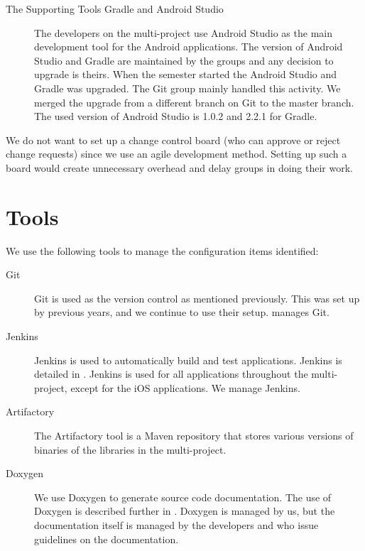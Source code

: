 \begin{description}
  \item[The Supporting Tools Gradle and Android Studio] The developers on the multi-project use Android Studio as the main development tool for the Android applications. The version of Android Studio and Gradle are maintained by the \bd groups and any decision to upgrade is theirs. When the semester started the Android Studio and Gradle was upgraded. The Git group mainly handled this activity. We merged the upgrade from a different branch on Git to the master branch. The used version of Android Studio is 1.0.2 and 2.2.1 for Gradle.
\end{description}

We do not want to set up a change control board (who can approve or reject change requests) since we use an agile development method. Setting up such a board would create unnecessary overhead and delay groups in doing their work.

\section{Tools}\label{sec:SCM_tools}
We use the following tools to manage the configuration items identified:

\begin{description}
  \item[Git] Git is used as the version control as mentioned previously. This was set up by previous years, and we continue to use their setup.  manages Git.
  \item[Jenkins] Jenkins is used to automatically build and test applications. Jenkins is detailed in . Jenkins is used for all applications throughout the multi-project, except for the iOS applications. We manage Jenkins.
  \item[Artifactory] The Artifactory tool is a Maven repository that stores various versions of binaries of the libraries in the multi-project. 
  \item[Doxygen] We use Doxygen to generate source code documentation. The use of Doxygen is described further in . Doxygen is managed by us, but the documentation itself is managed by the developers and  who issue guidelines on the documentation.
\end{description}